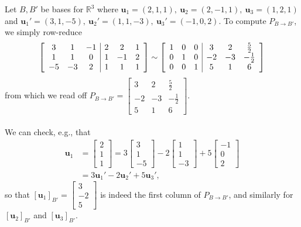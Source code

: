 \documentclass[12pt,letterpaper,reqno]{article}
\numberwithin{equation}{section}
\newcommand{\bu}{\mathbf{u}}
\begin{document}
\begin{example}
Let $B, B'$ be bases for $\mathbb{R}^3$ where $\bu_1=(2,1,1), \ \bu_2=(2,-1,1), \ \bu_3=(1,2,1)$ and $\bu_1'=(3,1,-5), \ \bu_2'=(1,1,-3), \ \bu_3'=(-1,0,2)$. To compute $P_{B \to B'}$, we simply row-reduce
\begin{align*}
	\left[\begin{array}{c c c | c c c}
		3 & 1 & -1 & 2 & 2 & 1 \\
		1 & 1 & 0 & 1 & -1 & 2 \\
		-5 & -3 & 2 & 1 & 1 & 1
	\end{array}\right] \sim \left[\begin{array}{c c c | c c c}
		1 & 0 & 0 & 3 & 2 &\frac{5}{2} \\
		0 & 1 & 0 & -2 & -3 & -\frac{1}{2}\\
		0 & 0 & 1 & 5 & 1 & 6
	\end{array}\right]
\end{align*}
from which we read off $P_{B \to B'}=\begin{bmatrix}
	 3 & 2 &\frac{5}{2} \\
		-2 & -3 & -\frac{1}{2}\\
		5 & 1 & 6
\end{bmatrix}$. \\
\\
We can check, e.g., that
\begin{align*}
	\bu_1&=\begin{bmatrix}
		2 \\ 1 \\ 1
	\end{bmatrix}=3\begin{bmatrix}
		3 \\ 1 \\ -5
	\end{bmatrix}-2\begin{bmatrix}
		1 \\ 1 \\ -3
	\end{bmatrix}+5\begin{bmatrix}
		-1 \\ 0 \\ 2
	\end{bmatrix} \\
	&=3\bu_1'-2\bu_2'+5\bu_3',
\end{align*}
so that $[\bu_1]_{B'}=\begin{bmatrix}
	3 \\ -2 \\ 5
\end{bmatrix}$ is indeed the first column of $P_{B \to B'}$, and similarly for $[\bu_2]_{B'}$ and $[\bu_3]_{B'}$.
\end{example}
\end{document}
